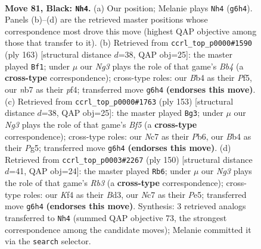 \documentclass[11pt]{article}
\begin{document}
\clearpage

\begin{figure}[p]\centering
\begin{subfigure}{0.46\textwidth}\centering
\resizebox{\linewidth}{!}{%
\newchessgame
\chessboard[
  setfen={8/1Nn5/6n1/p7/Pb1pPk2/1P1B3p/4P3/2K5 b - - 29 81},
  showmover=false,
  pgfstyle=straightmove, color=movearrow, markmove={g6-h4}
]}
\caption{}
\end{subfigure}\hfill
\begin{subfigure}{0.46\textwidth}\centering
\resizebox{\linewidth}{!}{%
\newchessgame
\chessboard[
  setfen={5B2/1K1k3p/p2P3P/Pb3p2/5P2/8/8/8 b - - 63 82},
  showmover=false,
  pgfstyle=straightmove, color=movearrow, markmove={b5-f1}
]}
\caption{}
\end{subfigure}
\\[4pt]
\begin{subfigure}{0.46\textwidth}\centering
\resizebox{\linewidth}{!}{%
\newchessgame
\chessboard[
  setfen={6B1/8/1p1k4/p2P2p1/P2K1bP1/1P3P2/8/8 b - - 44 77},
  showmover=false,
  pgfstyle=straightmove, color=movearrow, markmove={f4-g3}
]}
\caption{}
\end{subfigure}\hfill
\begin{subfigure}{0.46\textwidth}\centering
\resizebox{\linewidth}{!}{%
\newchessgame
\chessboard[
  setfen={r3b1k1/5p2/4pPpK/4P3/3p4/1R1B4/5P2/8 w - - 1 76},
  showmover=false,
  pgfstyle=straightmove, color=movearrow, markmove={b3-b6}
]}
\caption{}
\end{subfigure}
\caption{\textbf{Move 81, Black: \texttt{Nh4}.} (a) Our position; Melanie plays \texttt{Nh4} (\texttt{g6h4}). Panels (b)--(d) are the retrieved master positions whose correspondence most drove this move (highest QAP objective among those that transfer to it). (b) Retrieved from \texttt{ccrl\_top\_p0000\#1590} (ply 163) [structural distance $d$=38, QAP obj=25]: the master played \texttt{Bf1}; under $\mu$ our \emph{Ng3} plays the role of that game's \emph{Bb4} (a \textbf{cross-type} correspondence); cross-type roles: our \emph{B}b4 as their \emph{P}f5, our \emph{n}b7 as their \emph{p}f4; transferred move \texttt{g6h4} \textbf{(endorses this move)}. (c) Retrieved from \texttt{ccrl\_top\_p0000\#1763} (ply 153) [structural distance $d$=38, QAP obj=25]: the master played \texttt{Bg3}; under $\mu$ our \emph{Ng3} plays the role of that game's \emph{Bf5} (a \textbf{cross-type} correspondence); cross-type roles: our \emph{N}c7 as their \emph{P}b6, our \emph{B}b4 as their \emph{P}g5; transferred move \texttt{g6h4} \textbf{(endorses this move)}. (d) Retrieved from \texttt{ccrl\_top\_p0003\#2267} (ply 150) [structural distance $d$=41, QAP obj=24]: the master played \texttt{Rb6}; under $\mu$ our \emph{Ng3} plays the role of that game's \emph{Rb3} (a \textbf{cross-type} correspondence); cross-type roles: our \emph{K}f4 as their \emph{B}d3, our \emph{N}c7 as their \emph{P}e5; transferred move \texttt{g6h4} \textbf{(endorses this move)}. Synthesis: 3 retrieved analogs transferred to \texttt{Nh4} (summed QAP objective 73, the strongest correspondence among the candidate moves); Melanie committed it via the \texttt{search} selector.}
\label{fig:thought-m161}
\end{figure}
\end{document}
